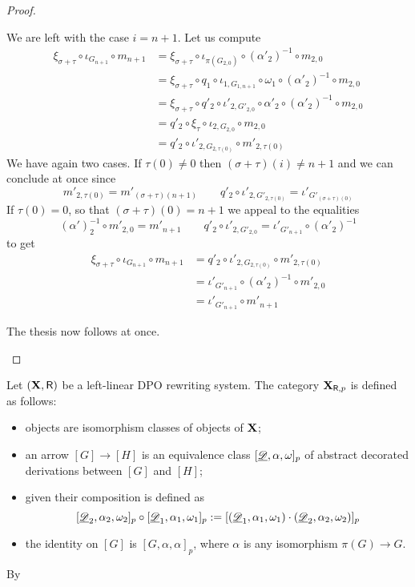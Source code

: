 \begin{proof}
\begin{itemize}
\begin{itemize}
			We are left with the case $i=n+1$. Let us compute
			\begin{align*}
				\xi_{\sigma+\tau}\circ \iota_{G_{n+1}} \circ m_{n+1} &= \xi_{\sigma+\tau} \circ \iota_{\pi(G_{2,0})} \circ (\alpha'_2)^{-1}\circ m_{2,0}\\&=\xi_{\sigma+\tau} \circ q_1\circ \iota_{1, G_{1,n+1}} \circ \omega_1 \circ (\alpha'_2)^{-1}\circ m_{2,0}\\&=\xi_{\sigma+\tau} \circ q'_2 \circ \iota'_{2,G'_{2,0}} \circ \alpha'_2 \circ (\alpha'_2)^{-1}\circ m_{2,0} \\&=q'_2 \circ \xi_\tau \circ \iota_{2, G_{2,0}} \circ m_{2,0}\\&=q'_2\circ \iota'_{2, G_{2,\tau(0)}} \circ m'_{2,\tau(0)}
			\end{align*}
			We have again two cases. If $\tau(0)\neq 0$ then $(\sigma+\tau)(i)\neq n+1$ and we can conclude at once since 
			\[m'_{2, \tau(0)}=m'_{(\sigma+\tau)(n+1)} \qquad q'_2\circ \iota'_{2, G'_{2,\tau(0)}}=
			\iota'_{G'_{(\sigma+\tau)(0)}}\] 
			If $\tau(0)=0$, so that  $(\sigma+\tau)(0)= n+1$ we appeal to the equalities
			\[(\alpha')^{-1}_2\circ m'_{2, 0}=m'_{n+1} \qquad q'_2\circ \iota'_{2, G'_{2, 0}}=
			\iota'_{G'_{n+1}}\circ (\alpha'_2)^{-1}\] 
			to get
			\begin{align*}
				\xi_{\sigma+\tau}\circ \iota_{G_{n+1}} \circ m_{n+1} &= q'_2\circ \iota'_{2, G_{2,\tau(0)}} \circ m'_{2,\tau(0)}\\&=	\iota'_{G'_{n+1}}\circ (\alpha'_2)^{-1}\circ m'_{2,0}\\&=\iota'_{G'_{n+1}}\circ  m'_{n+1}
			\end{align*}
		\end{itemize}
		The thesis now follows at once.	 \qedhere 
\end{itemize} \end{proof}

\begin{definition}
Let $(\textbf {\textup{X}}, \mathsf{R})$ be a left-linear DPO rewriting system. The category $\textbf {\textup{X}}_{\mathsf{R}, p}$ is defined as follows: 
	\begin{itemize}
	\item objects are isomorphism classes of objects of $\textbf {\textup{X}}$;
	\item an arrow $[G]\to [H]$ is an equivalence class $[\underline{\mathscr{D}}, \alpha, \omega]_p$ of abstract decorated derivations between $[G]$ and $[H]$;
	\item given their composition is defined as
	\[[\underline{\mathscr{D}}_2, \alpha_2, \omega_2]_p \circ [\underline{\mathscr{D}}_1, \alpha_1, \omega_1]_p:=[(\underline{\mathscr{D}}_1, \alpha_1, \omega_1) \cdot (\underline{\mathscr{D}}_2, \alpha_2, \omega_2)]_p\] 
	\item the identity on $[G]$ is $[G, \alpha, \alpha]_p$, where $\alpha$ is any isomorphism $\pi(G)\to G$.	\end{itemize}
\end{definition}
\begin{remark}By 
\end{remark}

